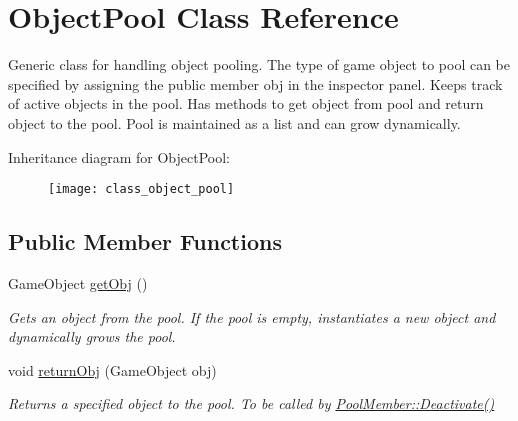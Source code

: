 \hypertarget{class_object_pool}{}\section{Object\+Pool Class Reference}
\label{class_object_pool}


Generic class for handling object pooling. The type of game object to pool can be specified by assigning the public member obj in the inspector panel. Keeps track of active objects in the pool. Has methods to get object from pool and return object to the pool. Pool is maintained as a list and can grow dynamically.  


Inheritance diagram for Object\+Pool\+:\begin{figure}[H]
\begin{center}
\leavevmode
\texttt{[image: class\_object\_pool]}
\end{center}
\end{figure}
\subsection*{Public Member Functions}
\begin{DoxyCompactItemize}
\item 
Game\+Object \hyperlink{class_object_pool_a1a2f42245b2acfef316e203e6a88c7f2}{get\+Obj} ()
\begin{DoxyCompactList}\small\item\em Gets an object from the pool. If the pool is empty, instantiates a new object and dynamically grows the pool. \end{DoxyCompactList}\item 
void \hyperlink{class_object_pool_a61d15dbf443949f7a0b59031c6a8d2e4}{return\+Obj} (Game\+Object obj)
\begin{DoxyCompactList}\small\item\em Returns a specified object to the pool. To be called by \hyperlink{class_pool_member_a6f883eaed133e4b288a3847aea3ff33a}{Pool\+Member\+::\+Deactivate()} \end{DoxyCompactList}\end{DoxyCompactItemize}
